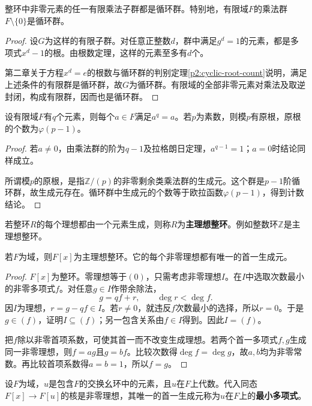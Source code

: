 \begin{theorem}\label{p2:finite-multiplicative-subgroup}
整环中非零元素的任一有限乘法子群都是循环群。特别地，有限域$F$的乘法群$F\setminus\{0\}$是循环群。
\end{theorem}
\begin{proof}
设$G$为这样的有限子群。对任意正整数$d$，群中满足$g^d=1$的元素，都是多项式$x^d-1$的根。由根数定理，这样的元素至多有$d$个。

第二章关于方程$x^d=e$的根数与循环群的判别定理\ref{p2:cyclic-root-count}说明，满足上述条件的有限群是循环群，故$G$为循环群。有限域的全部非零元素对乘法及取逆封闭，构成有限群，因而也是循环群。
\end{proof}

\begin{corollary}
设有限域$F$有$q$个元素，则每个$a\in F$满足$a^q=a$。若$p$为素数，则模$p$有原根，原根的个数为$\varphi(p-1)$。
\end{corollary}
\begin{proof}
若$a\ne0$，由乘法群的阶为$q-1$及拉格朗日定理，$a^{q-1}=1$；$a=0$时结论同样成立。

所谓模$p$的原根，是指$\mathbb Z/(p)$的非零剩余类乘法群的生成元。这个群是$p-1$阶循环群，故生成元存在。循环群中生成元的个数等于欧拉函数$\varphi(p-1)$，得到计数结论。
\end{proof}

\begin{definition}
若整环$R$的每个理想都由一个元素生成，则称$R$为\textbf{主理想整环}。例如整数环$\mathbb Z$是主理想整环。
\end{definition}

\begin{theorem}\label{p2:field-poly-pid}
若$F$为域，则$F[x]$为主理想整环。它的每个非零理想都有唯一的首一生成元。
\end{theorem}
\begin{proof}
$F[x]$为整环。零理想等于$(0)$，只需考虑非零理想$I$。在$I$中选取次数最小的非零多项式$f$。对任意$g\in I$作带余除法，
\[
g=qf+r,\qquad\deg r<\deg f.
\]
因$I$为理想，$r=g-qf\in I$。若$r\ne0$，就违反$f$次数最小的选择，所以$r=0$。于是$g\in(f)$，证明$I\subseteq(f)$；另一包含关系由$f\in I$得到。因此$I=(f)$。

把$f$除以非零首项系数，可使其首一而不改变生成理想。若两个首一多项式$f,g$生成同一非零理想，则$f=ag$且$g=bf$。比较次数得$\deg f=\deg g$，故$a,b$均为非零常数。再比较首项系数得$a=b=1$，所以$f=g$。
\end{proof}

\begin{definition}
设$F$为域，$u$是包含$F$的交换幺环中的元素，且$u$在$F$上代数。代入同态$F[x]\to F[u]$的核是非零理想，其唯一的首一生成元称为$u$在$F$上的\textbf{最小多项式}。
\end{definition}

